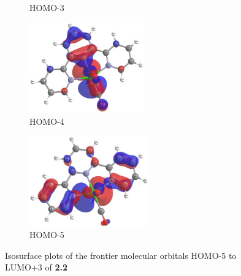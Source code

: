 \begin{figure}[!ht]
\begin{subfigure}[b]{0.31\textwidth}
  \caption{HOMO-3}
 \end{subfigure}
 \begin{subfigure}[b]{0.31\textwidth}
  \includegraphics[clip=true, width=\textwidth, height=39mm, keepaspectratio]{images/mos/2h-4.eps}
  \caption{HOMO-4}
 \end{subfigure}
 \begin{subfigure}[b]{0.31\textwidth}
  \includegraphics[clip=true, width=\textwidth, height=39mm, keepaspectratio]{images/mos/2h-5.eps}
  \caption{HOMO-5}
 \end{subfigure}
\caption[Molecular orbitals HOMO-5 to LUMO+3 of \textbf{2.2}]{Isosurface plots of the frontier molecular orbitals HOMO-5 to LUMO+3 of \textbf{2.2}}
\label{fig.mo22}
\end{figure} 

